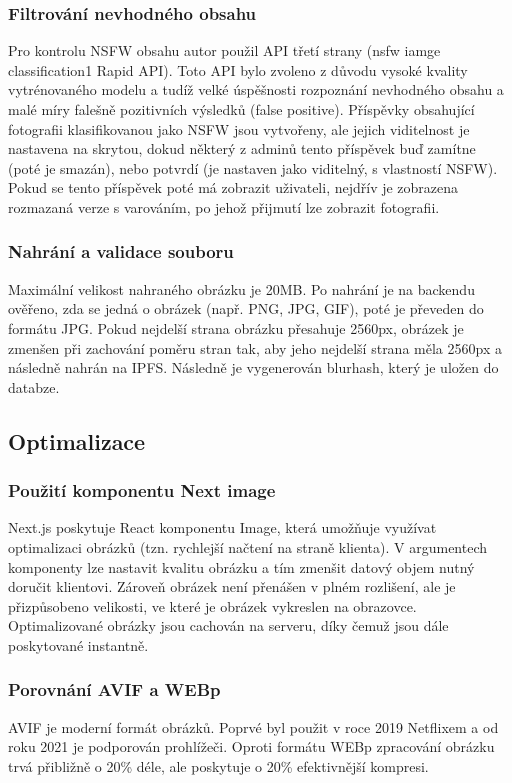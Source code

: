 \documentclass[12pt, a4paper,
 twoside,        %
 openright
]{report}
\begin{document}
\subsubsection{Filtrování nevhodného obsahu}\label{section:nsfw_filter}
Pro kontrolu NSFW obsahu autor použil API třetí strany (nsfw iamge classification1 Rapid API). Toto API bylo zvoleno z důvodu vysoké kvality vytrénovaného modelu a tudíž velké úspěšnosti rozpoznání nevhodného obsahu a malé míry falešně pozitivních výsledků (false positive). Příspěvky obsahující fotografii klasifikovanou jako NSFW jsou vytvořeny, ale jejich viditelnost je nastavena na skrytou, dokud některý z adminů tento příspěvek buď zamítne (poté je smazán), nebo potvrdí (je nastaven jako viditelný, s vlastností NSFW). Pokud se tento příspěvek poté má zobrazit uživateli, nejdřív je zobrazena rozmazaná verze s varováním, po jehož přijmutí lze zobrazit fotografii.

\subsubsection{Nahrání a validace souboru} Maximální velikost nahraného obrázku je 20MB.  Po nahrání je na backendu ověřeno, zda se jedná o obrázek (např. PNG, JPG, GIF), poté je převeden do formátu JPG. Pokud nejdelší strana obrázku přesahuje 2560px, obrázek je zmenšen při zachování poměru stran tak, aby jeho nejdelší strana měla 2560px a následně nahrán na IPFS. Následně je vygenerován blurhash, který je uložen do databze.
\subsection{Optimalizace}
\subsubsection{Použití komponentu Next image}
Next.js poskytuje React komponentu Image, která umožňuje využívat optimalizaci obrázků (tzn. rychlejší načtení na straně klienta). V argumentech komponenty lze nastavit kvalitu obrázku a tím zmenšit datový objem nutný doručit klientovi. Zároveň obrázek není přenášen v plném rozlišení, ale je přizpůsobeno velikosti, ve které je obrázek vykreslen na obrazovce. Optimalizované obrázky jsou cachován na serveru, díky čemuž jsou dále poskytované instantně. \cite{nextImage}
\subsubsection{Porovnání AVIF a WEBp}
AVIF je moderní formát obrázků. Poprvé byl použit v roce 2019 Netflixem a od roku 2021 je podporován prohlížeči. Oproti formátu WEBp zpracování obrázku trvá přibližně o 20\% déle, ale poskytuje o 20\% efektivnější kompresi.
\end{document}
